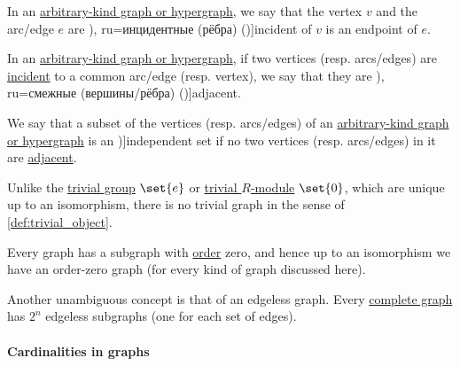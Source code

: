 \begin{definition}\label{def:graph_incidence}
  In an \hyperref[rem:arbitrary_kind_graph]{arbitrary-kind graph or hypergraph}, we say that the vertex \( v \) and the arc/edge \( e \) are \term[bg=инцидентни (ребра) (\cite[7]{Мирчев2001Графи}), ru=инцидентные (рёбра) (\cite[9]{ЕмеличевИПр1990ТеорияГрафов})]{incident} of \( v \) is an endpoint of \( e \).
\end{definition}

\begin{definition}\label{def:graph_adjacency}
  In an \hyperref[rem:arbitrary_kind_graph]{arbitrary-kind graph or hypergraph}, if two vertices (resp. arcs/edges) are \hyperref[def:graph_incidence]{incident} to a common arc/edge (resp. vertex), we say that they are \term[bg=съседни (върхове/дъги/ребра) (\cite[7]{Мирчев2001Графи}), ru=смежные (вершины/рёбра) (\cite[9]{ЕмеличевИПр1990ТеорияГрафов})]{adjacent}.
\end{definition}

\begin{definition}\label{def:graph_independent_set}
  We say that a subset of the vertices (resp. arcs/edges) of an \hyperref[rem:arbitrary_kind_graph]{arbitrary-kind graph or hypergraph} is an \term[bg=независимо множество (\cite[103]{Мирчев2001Графи})]{independent set} if no two vertices (resp. arcs/edges) in it are \hyperref[def:graph_adjacency]{adjacent}.
\end{definition}

\begin{remark}\label{rem:trivial_graph}
  Unlike the \hyperref[def:group/trivial]{trivial group} \( \set{ e } \) or \hyperref[def:module/trivial]{trivial \( R \)-module} \( \set{ 0 } \), which are unique up to an isomorphism, there is no trivial graph in the sense of \cref{def:trivial_object}.

  Every graph has a subgraph with \hyperref[def:graph_cardinality/order]{order} zero, and hence up to an isomorphism we have an order-zero graph (for every kind of graph discussed here).

  Another unambiguous concept is that of an edgeless graph. Every \hyperref[def:complete_graph]{complete graph} has \( 2^n \) edgeless subgraphs (one for each set of edges).
\end{remark}

\paragraph{Cardinalities in graphs}

